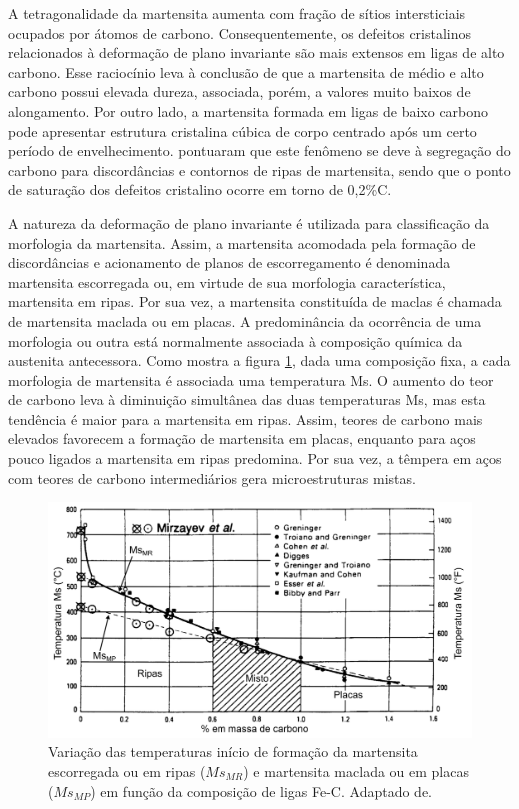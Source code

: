 A tetragonalidade da martensita aumenta com fração de sítios intersticiais ocupados por átomos de carbono. Consequentemente, os defeitos cristalinos relacionados à deformação de plano invariante são mais extensos em ligas de alto carbono. Esse raciocínio leva à conclusão de que a martensita de médio e alto carbono possui elevada dureza, associada, porém, a valores muito baixos de alongamento. Por outro lado, a martensita formada em ligas de baixo carbono pode apresentar estrutura cristalina cúbica de corpo centrado após um certo período de envelhecimento.  pontuaram que este fenômeno se deve à segregação do carbono para discordâncias e contornos de ripas de martensita, sendo que o ponto de saturação dos defeitos cristalino ocorre em torno de 0,2\%C.

A natureza da deformação de plano invariante é utilizada para classificação da morfologia da martensita. Assim, a martensita acomodada pela formação de discordâncias e acionamento de planos de escorregamento é denominada martensita escorregada ou, em virtude de sua morfologia característica, martensita em ripas. Por sua vez, a martensita constituída de maclas é chamada de martensita maclada ou em placas. A predominância da ocorrência de uma morfologia ou outra está normalmente associada à composição química da austenita antecessora. Como mostra a figura \ref{fig:MsZhaoNotis}, dada uma composição fixa, a cada morfologia de martensita é associada uma temperatura Ms. O aumento do teor de carbono leva à diminuição simultânea das duas temperaturas Ms, mas esta tendência é maior para a martensita em ripas. Assim, teores de carbono mais elevados favorecem a formação de martensita em placas, enquanto para aços pouco ligados a martensita em ripas predomina. Por sua vez, a têmpera em aços com teores de carbono intermediários gera microestruturas mistas.

\begin{figure}
	\includegraphics[width=16cm]{img/Ms_Zhao.pdf}
	\caption{Variação das temperaturas início de formação da martensita escorregada ou em ripas ($Ms_{MR}$) e martensita maclada ou em placas ($Ms_{MP}$) em função da composição de ligas Fe-C. Adaptado de\cite{Zhao1995}.}
	\label{fig:MsZhaoNotis}
\end{figure}

